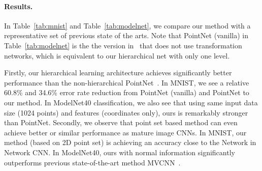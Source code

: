 

\vspace{-0.3cm}
\paragraph{Results.} In Table~\ref{tab:mnist} and Table~\ref{tab:modelnet}, we compare our method with a representative set of previous state of the arts. Note that PointNet (vanilla) in Table~\ref{tab:modelnet} is the the version in~\cite{qi2016pointnet} that does not use transformation networks, which is equivalent to our hierarchical net with only one level.

Firstly, our hierarchical learning architecture achieves significantly better performance than the non-hierarchical PointNet~\cite{qi2016pointnet}. In MNIST, we see a relative 60.8\% and 34.6\% error rate reduction from PointNet (vanilla) and PointNet to our method. In ModelNet40 classification, we also see that using same input data size (1024 points) and features (coordinates only), ours is remarkably stronger than PointNet.
Secondly, we observe that point set based method can even achieve better or similar performance as mature image CNNs. In MNIST, our method (based on 2D point set) is achieving an accuracy close to the Network in Network CNN. In ModelNet40, ours with normal information significantly outperforms previous state-of-the-art method MVCNN~\cite{su15mvcnn}. %

